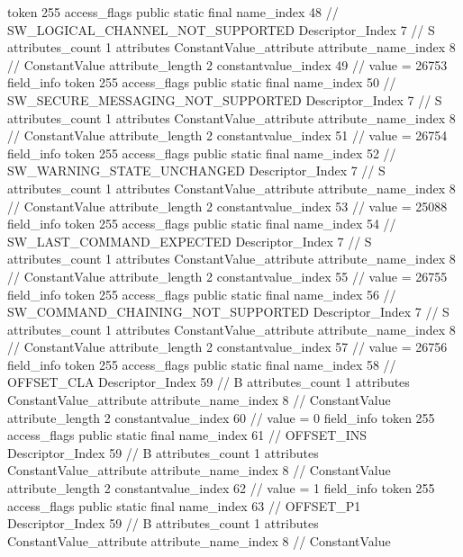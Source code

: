 {{{{{				token	255
				access_flags	public static final
				name_index	48		// SW_LOGICAL_CHANNEL_NOT_SUPPORTED
				Descriptor_Index	7		// S
				attributes_count	1
				attributes {
				ConstantValue_attribute {
					attribute_name_index	8		// ConstantValue
					attribute_length	2
					constantvalue_index	49		// value = 26753
				}
				}
			}
			field_info {
				token	255
				access_flags	public static final
				name_index	50		// SW_SECURE_MESSAGING_NOT_SUPPORTED
				Descriptor_Index	7		// S
				attributes_count	1
				attributes {
				ConstantValue_attribute {
					attribute_name_index	8		// ConstantValue
					attribute_length	2
					constantvalue_index	51		// value = 26754
				}
				}
			}
			field_info {
				token	255
				access_flags	public static final
				name_index	52		// SW_WARNING_STATE_UNCHANGED
				Descriptor_Index	7		// S
				attributes_count	1
				attributes {
				ConstantValue_attribute {
					attribute_name_index	8		// ConstantValue
					attribute_length	2
					constantvalue_index	53		// value = 25088
				}
				}
			}
			field_info {
				token	255
				access_flags	public static final
				name_index	54		// SW_LAST_COMMAND_EXPECTED
				Descriptor_Index	7		// S
				attributes_count	1
				attributes {
				ConstantValue_attribute {
					attribute_name_index	8		// ConstantValue
					attribute_length	2
					constantvalue_index	55		// value = 26755
				}
				}
			}
			field_info {
				token	255
				access_flags	public static final
				name_index	56		// SW_COMMAND_CHAINING_NOT_SUPPORTED
				Descriptor_Index	7		// S
				attributes_count	1
				attributes {
				ConstantValue_attribute {
					attribute_name_index	8		// ConstantValue
					attribute_length	2
					constantvalue_index	57		// value = 26756
				}
				}
			}
			field_info {
				token	255
				access_flags	public static final
				name_index	58		// OFFSET_CLA
				Descriptor_Index	59		// B
				attributes_count	1
				attributes {
				ConstantValue_attribute {
					attribute_name_index	8		// ConstantValue
					attribute_length	2
					constantvalue_index	60		// value = 0
				}
				}
			}
			field_info {
				token	255
				access_flags	public static final
				name_index	61		// OFFSET_INS
				Descriptor_Index	59		// B
				attributes_count	1
				attributes {
				ConstantValue_attribute {
					attribute_name_index	8		// ConstantValue
					attribute_length	2
					constantvalue_index	62		// value = 1
				}
				}
			}
			field_info {
				token	255
				access_flags	public static final
				name_index	63		// OFFSET_P1
				Descriptor_Index	59		// B
				attributes_count	1
				attributes {
				ConstantValue_attribute {
					attribute_name_index	8		// ConstantValue
}}}}}}}
